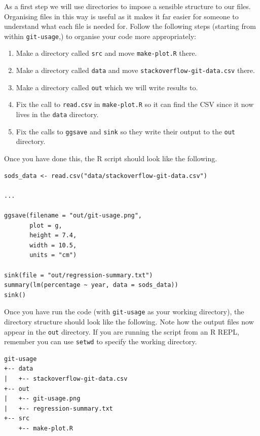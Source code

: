 \documentclass[11pt,onecolumn]{scrartcl}
\begin{document}
As a first step we will use directories to impose a sensible structure to our
files. Organising files in this way is useful as it makes it far easier for
someone to understand what each file is needed for. Follow the following steps
(starting from within \texttt{git-usage},) to organise your code more appropriately:

\begin{enumerate}
\item Make a directory called \texttt{src} and move \texttt{make-plot.R} there.
\item Make a directory called \texttt{data} and move \texttt{stackoverflow-git-data.csv} there.
\item Make a directory called \texttt{out} which we will write results to.
\item Fix the call to \texttt{read.csv} in \texttt{make-plot.R} so it can find the CSV since it
now lives in the \texttt{data} directory.
\item Fix the calls to \texttt{ggsave} and \texttt{sink} so they write their output to the \texttt{out}
directory.
\end{enumerate}

Once you have done this, the R script should look like the following.

\lstset{language=r,label= ,caption= ,captionpos=b,numbers=none}
\begin{lstlisting}
sods_data <- read.csv("data/stackoverflow-git-data.csv")

...

ggsave(filename = "out/git-usage.png",
       plot = g,
       height = 7.4,
       width = 10.5,
       units = "cm")

sink(file = "out/regression-summary.txt")
summary(lm(percentage ~ year, data = sods_data))
sink()
\end{lstlisting}

Once you have run the code (with \texttt{git-usage} as your working directory), the
directory structure should look like the following. Note how the output files
now appear in the \texttt{out} directory. If you are running the script from an R REPL,
remember you can use \texttt{setwd} to specify the working directory.

\begin{Verbatim}[frame=single,framerule=0.5mm,framesep=2mm,label=Git Usage,xleftmargin=3cm,xrightmargin=3cm]
git-usage
+-- data
|   +-- stackoverflow-git-data.csv
+-- out
|   +-- git-usage.png
|   +-- regression-summary.txt
+-- src
    +-- make-plot.R
\end{Verbatim}
\end{document}
